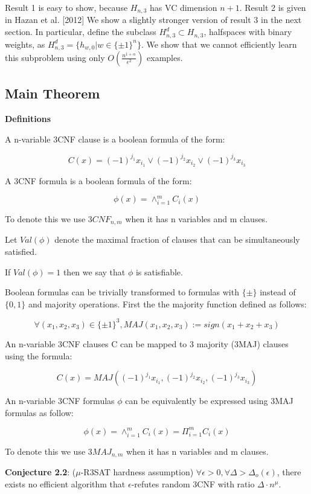 \documentclass[11pt,a4paper]{article}
\begin{document}
Result 1 is easy to show, because $H_{n, 3}$ has VC dimension $n + 1$.
Result 2 is given in Hazan et al. [2012]
We show a slightly stronger version of result 3 in the next section. In particular, define the subclass $H_{n, 3}^d \subset H_{n, 3}$, halfspaces with binary weights, as $H_{n, 3}^d = \{h_{w, 0} | w \in \{\pm 1\}^n\}$. We show that we cannot efficiently learn this subproblem using only $O(\frac{n^{1 + \alpha}}{\epsilon^2})$ examples.

\subsection{Main Theorem}

\textbf{Definitions}

A n-variable 3CNF clause is a boolean formula of the form:

$$C(x) = (-1)^{j_1}x_{i_1} \vee (-1)^{j_2}x_{i_2} \vee (-1)^{j_3}x_{i_3} $$

A 3CNF formula is a boolean formula of the form:

$$ \phi(x) = \wedge^m_{i=1} C_{i}(x) $$

To denote this we use $3CNF_{n,m}$ when it has n variables and m clauses.

Let $Val(\phi)$ denote the maximal fraction of clauses that can be simultaneously satisfied.

If $Val(\phi) =  1$ then we say that $\phi$ is satisfiable.

Boolean formulas can be trivially transformed to formulas with $\{ \pm \}$ instead of $\{ 0,1 \}$ and majority operations.
First the the majority function defined as follows:

$$\forall (x_1, x_2, x_3) \in \{ \pm 1 \}^3, MAJ(x_1, x_2, x_3 ) := sign(x_1 + x_2 + x_3 )$$

An n-variable 3CNF clauses C can be mapped to 3 majority (3MAJ) clauses using the formula:

$$ C(x) = MAJ( (-1)^{j_1}x_{i_1} , (-1)^{j_2}x_{i_2} , (-1)^{j_3}x_{i_3} )$$

An n-variable 3CNF formulas $\phi$ can be equivalently be expressed using 3MAJ formulas as follow:

$$ \phi(x) = \wedge^m_{i=1} C_{i}(x)  = \Pi^m_{i=1} C_{i}(x) $$

To denote this we use $3MAJ_{n,m}$ when it has n variables and m clauses.

\textbf{Conjecture 2.2}: ($\mu$-R3SAT hardness assumption) $\forall \epsilon > 0, \forall \Delta > \Delta_o(\epsilon) $, there exists no efficient algorithm that $\epsilon$-refutes random 3CNF with ratio $\Delta \cdot n^{\mu}$.
\end{document}
